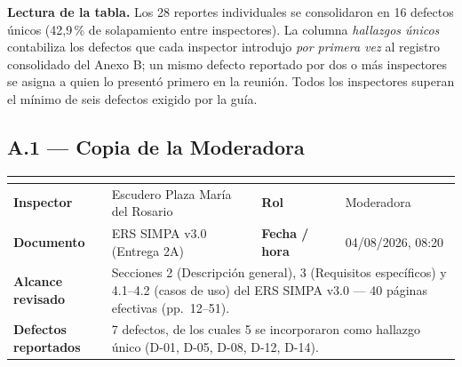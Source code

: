 \documentclass[11pt,letterpaper]{article}
\newcommand{\ficha}[5]{%
\begin{center}\small
\begin{tabularx}{\textwidth}{|>{\bfseries}p{3.2cm}|X|>{\bfseries}p{2.6cm}|p{4.2cm}|}
\hline
\rowcolor{gris}\multicolumn{4}{|l|}{\bfseries Lista de verificación de inspección --- Anexo A (ISO/IEC/IEEE 29148:2018, §6.4)}\\
\hline
Inspector & #1 & Rol & #2 \\
\hline
Documento & ERS SIMPA v3.0 (Entrega 2A) & Fecha / hora & #3 \\
\hline
Alcance revisado & \multicolumn{3}{p{12.6cm}|}{#4} \\
\hline
Defectos reportados & \multicolumn{3}{p{12.6cm}|}{#5} \\
\hline
\end{tabularx}
\end{center}}
\begin{document}
\small
\textbf{Lectura de la tabla.} Los 28 reportes individuales se consolidaron en 16 defectos
únicos (42,9\,\% de solapamiento entre inspectores). La columna \emph{hallazgos únicos}
contabiliza los defectos que cada inspector introdujo \emph{por primera vez} al registro
consolidado del Anexo B; un mismo defecto reportado por dos o más inspectores se asigna a
quien lo presentó primero en la reunión. Todos los inspectores superan el mínimo de seis
defectos exigido por la guía.
\normalsize

\clearpage

\subsection*{A.1 --- Copia de la Moderadora}
\ficha{Escudero Plaza María del Rosario}{Moderadora}{04/08/2026, 08:20}
{Secciones 2 (Descripción general), 3 (Requisitos específicos) y 4.1--4.2 (casos de uso) del ERS SIMPA v3.0 --- 40 páginas efectivas (pp.\ 12--51).}
{7 defectos, de los cuales 5 se incorporaron como hallazgo único (D-01, D-05, D-08, D-12, D-14).}
\end{document}
